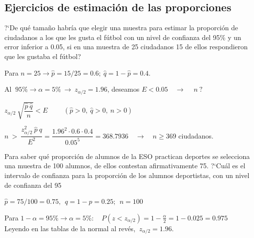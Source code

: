 \vspace{4mm}
\subsection{Ejercicios de estimación de las proporciones}


\vspace{5mm} %
\begin{ejemplo}
\begin{ejer}
	?`De qué tamaño habría que elegir una muestra para estimar la proporción de ciudadanos a los que les gusta el fútbol con un nivel de confianza del 95\% y un error inferior a 0.05, si en una muestra de 25 ciudadanos 15 de ellos respondieron que les gustaba el fútbol? 
\end{ejer}	
\end{ejemplo}

Para $n=25 \to \hat p=15/25=0.6; \ \hat q=1-\hat p=0.4$.

\vspace{2mm} Al $\ 95\% \to \alpha=5\%  \ \to \ z_{\alpha/2}=1.96$, deseamos $E<0.05 \quad \to \quad \ n \ ?$

\vspace{2mm} $z_{\alpha/2} \  \sqrt{\dfrac{\hat p \  \hat q}{n}} < E\qquad $ \textcolor{gris}{$ ( \hat p > 0, \ \hat q > 0,\ n>0) $}


\vspace{2mm} $n\ >\ \dfrac{z^2_{\alpha/2} \ \hat p \ \hat q}{E^2} = \dfrac {1.96^2 \cdot 0.6 \cdot 0.4}{0.05^5}=368.7936 \quad \to \quad n\ge 369$ ciudadanos.


\vspace{5mm} %
\begin{ejemplo}
\begin{ejer}
	Para saber qué proporción de alumnos de la ESO practican deportes se selecciona una muestra de 100 alumnos, de ellos contestan afirmativamente 75. ?`Cuál es el intervalo de confianza para la proporción de los alumnos deportistas, con un nivel de confianza del 95%
\end{ejer}	
\end{ejemplo}

\vspace{2mm} $\hat p=75/100=0.75,\ \ q=1-p=0.25;\ \ n=100$

\vspace{2mm} Para $1-\alpha=95\% \to \alpha=5\%:\quad P(z<z_{\alpha/2})=1-\frac \alpha 2 =1-0.025=0.975\ $ Leyendo en las tablas de la normal al revés, $\ z_{\alpha/2}=1.96$.

